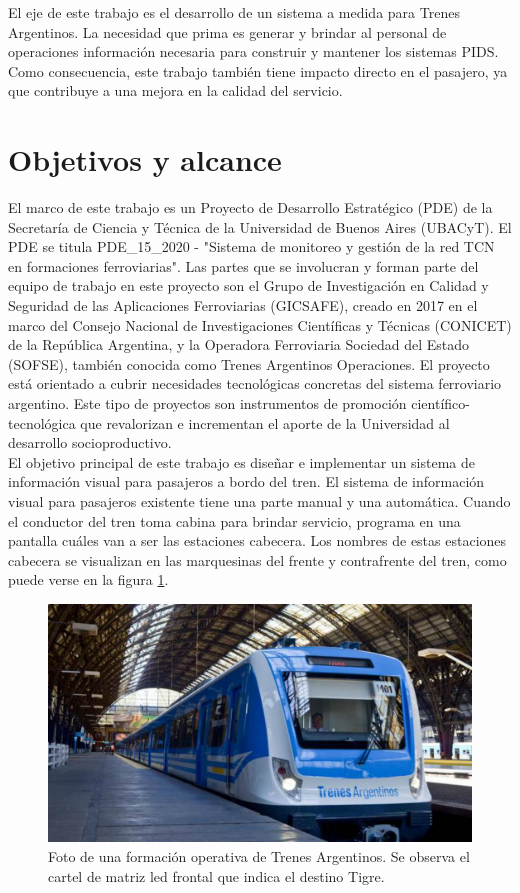 El eje de este trabajo es el desarrollo de un sistema a medida para Trenes Argentinos. La necesidad que prima es generar y brindar al personal de operaciones información necesaria para construir y mantener los sistemas PIDS. Como consecuencia, este trabajo también tiene impacto directo en el pasajero, ya que contribuye a una mejora en la calidad del servicio.\\


\pagebreak
\section{Objetivos y alcance}

El  marco de este trabajo es un Proyecto de Desarrollo Estratégico (PDE) de la Secretaría de Ciencia y Técnica de la Universidad de Buenos Aires (UBACyT). El PDE se titula PDE\_15\_2020 - "Sistema de monitoreo y gestión de la red TCN en formaciones ferroviarias". Las partes que se involucran y forman parte del equipo de trabajo en este proyecto son el Grupo de Investigación en Calidad y Seguridad de las Aplicaciones Ferroviarias (GICSAFE), creado en 2017 en el marco del Consejo Nacional de Investigaciones Científicas y Técnicas (CONICET) de la República Argentina, y la  Operadora Ferroviaria Sociedad del Estado (SOFSE), también conocida como Trenes Argentinos Operaciones. El proyecto está orientado a cubrir necesidades tecnológicas concretas del sistema ferroviario argentino. Este tipo de proyectos son instrumentos de promoción científico-tecnológica que revalorizan e incrementan el aporte de la Universidad al desarrollo socioproductivo.\\

El objetivo principal de este trabajo es diseñar e implementar un sistema de información visual para pasajeros a bordo del tren. El sistema de información visual para pasajeros existente tiene una parte manual y una automática. Cuando el conductor del tren toma cabina para brindar servicio, programa en una pantalla cuáles van a ser las estaciones cabecera. Los nombres de estas estaciones cabecera se visualizan en las marquesinas del frente y contrafrente del tren, como puede verse en la figura \ref{fig:tren}.

\begin{figure}[ht]
	\centering
	\includegraphics[width=1\textwidth]{./Figures/tren.jpg}
	\caption{Foto de una formación operativa de Trenes Argentinos. Se observa el cartel de matriz led frontal que indica el destino Tigre.}
	\label{fig:tren}
\end{figure}


